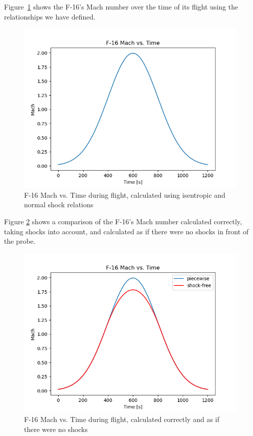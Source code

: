 \documentclass[../main.tex]{subfiles}
\begin{document}
Figure~\ref{MvsT_correct} shows the F-16's Mach number over the time of its flight using the relationships we have defined.

\begin{figure}[h]
    \centering
    \includegraphics[scale=.7]{../images/problem_2/Mach_vs_Time_F16.png}
    \caption{F-16 Mach vs. Time during flight, calculated using isentropic and normal shock relations}
    \label{MvsT_correct}
\end{figure}

Figure \ref{MvsT_shockfree} shows a comparison of the F-16's Mach number calculated correctly, taking shocks into account, and calculated as if there were no shocks in front of the probe.

\begin{figure}[h]
    \centering
    \includegraphics[scale=.7]{../images/problem_2/Mach_vs_Time_F16_Piecewise_Simple.png}
    \caption{F-16 Mach vs. Time during flight, calculated correctly and as if there were no shocks}
    \label{MvsT_shockfree}
\end{figure}
\end{document}
